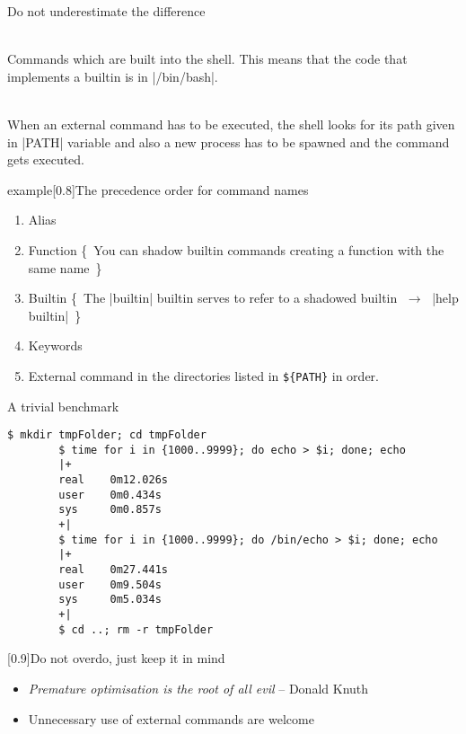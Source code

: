 
\begin{frame}{Do not underestimate the difference}
    \vspace{-3mm}
    \begin{description}[XXX]
        \item[\textbf{Internal Commands:}] ~ \\
            Commands which are built into the shell.
            This means that the code that implements a builtin is in \bash|/bin/bash|.
        \item[\textbf{External Commands:}] ~ \\
            When an external command has to be executed, the shell looks for its path given in \bash|PATH| variable and also a new process has to be spawned and the command gets executed.
    \end{description}
    \begin{varblock}{example}[0.8\textwidth]{The precedence order for command names}
        \begin{enumerate}
            \item Alias
            \item Function {\tiny\{~You can shadow builtin commands creating a function with the same name~\}}
            \item Builtin  {\tiny\{~The \bash|builtin| builtin serves to refer to a shadowed builtin $\;\to\;$ \bash|help builtin|~\}}
            \item Keywords
            \item External command in the directories listed in \texttt{\$\{PATH\}} in order.
        \end{enumerate}
    \end{varblock}
\end{frame}
\begin{frame}[fragile]{A trivial benchmark}
    \begin{lstlisting}[style=MyBash]
        $ mkdir tmpFolder; cd tmpFolder
        $ time for i in {1000..9999}; do echo > $i; done; echo
        |+
        real    0m12.026s
        user    0m0.434s
        sys     0m0.857s
        +|
        $ time for i in {1000..9999}; do /bin/echo > $i; done; echo
        |+
        real    0m27.441s
        user    0m9.504s
        sys     0m5.034s
        +|
        $ cd ..; rm -r tmpFolder
    \end{lstlisting}
    \medskip
    \begin{varblock}{}[0.9\textwidth]{Do not overdo, just keep it in mind}
        \begin{itemize}
            \item \emph{\guillemotleft Premature optimisation is the root of all evil\guillemotright} -- Donald Knuth
            \item Unnecessary use of external commands are welcome
        \end{itemize}
    \end{varblock}
\end{frame}
